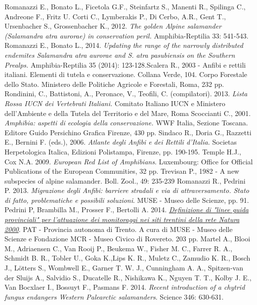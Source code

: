 \documentclass[10pt,twoside,openany,x11names,svgnames,italian,a5paper,dvipsnames,table]{memoir}
\begin{document}
\begin{thebibliography}{9}
Romanazzi E., Bonato L., Ficetola G.F., Steinfartz S., Manenti R., Spilinga C., Andreone F., Fritz U. Corti C., Lymberakis P., Di Cerbo, A.R., Gent T., Ursenbacher S., Grossenbacher K., 2012. \emph{The golden Alpine salamander (\emph{Salamandra atra aurorae}) in conservation peril.} Amphibia-Reptilia 33: 541-543.
Romanazzi E., Bonato L., 2014. \emph{Updating the range of the narrowly distributed endemites \emph{Salamandra atra aurorae} and \emph{S. atra pasubiensis} on the Southern Prealps.} Amphibia-Reptilia 35 (2014): 123-128.Scalera R., 2003 - Anfibi e rettili italiani. Elementi di tutela e conservazione. Collana Verde, 104. Corpo Forestale dello Stato. Ministero delle Politiche Agricole e Forestali, Roma, 232 pp.
Rondinini, C., Battistoni, A., Peronace, V., Teofili, C. (compilatori). 2013. \emph{Lista Rossa IUCN dei Vertebrati Italiani.} Comitato Italiano IUCN e Ministero dell’Ambiente e della Tutela del Territorio e del Mare, Roma
Scoccianti C., 2001. \emph{Amphibia: aspetti di ecologia della conservazione.} WWF Italia, Sezione Toscana. Editore Guido Persichino Grafica Firenze, 430 pp.
Sindaco R., Doria G., Razzetti E., Bernini F. (eds.), 2006. \emph{Atlante degli Anfibi e dei Rettili d'Italia.} Societas Herpetologica Italica, Edizioni Polistampa, Firenze, pp. 190-195.
Temple H.J., Cox N.A. 2009. \emph{European Red List of Amphibians}. Luxembourg: Office for Official Publications of the European Communities, 32 pp.
Trevisan P., 1982 - A new subspecies of alpine salamander. Boll. Zool., 49: 235-239
Romanazzi R., Pedrini P. 2013. \emph{Migrazione degli Anfibi: barriere stradali e via di attraversamento. Stato di fatto, problematiche e possibili soluzioni}. MUSE - Museo delle Scienze, pp. 91. 
 Pedrini P, Brambilla M., Prosser F., Bertolli A. 2014. \href{http://www.lifeten.tn.it/binary/pat_lifeten/azioni_preparatorie/LifeTEN_Report_A5.1395325489.pdf}{\emph{Definizione di "linee guida provinciali" per l'attuazione dei monitoraggi nei siti trentini della rete Natura 2000}}. PAT - Provincia autonoma di Trento. A cura di MUSE - Museo delle Scienze e Fondazione MCR - Museo Civico di Rovereto. 203 pp. 
 Martel A., Blooi M., Adriaensen C., Van Rooij P., Beukema W., Fisher  M. C., Farrer  R. A., Schmidt B. R., Tobler U., Goka K.,Lips K. R., Muletz C., Zamudio K. R., Bosch J., Lötters S., Wombwell E., Garner T. W. J., Cunningham A. A., Spitzen-van der Sluijs A., Salvidio S., Ducatelle R., Nishikawa K., Nguyen T. T., Kolby J. E., Van Bocxlaer I., Bossuyt F., Pasmans F. 2014. \emph{Recent introduction of a chytrid fungus endangers Western Palearctic salamanders}. Science 346: 630-631.




\end{thebibliography}
\end{document}
